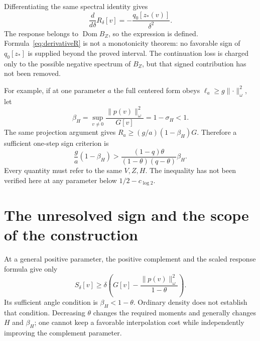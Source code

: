 \documentclass[11pt,a4paper]{article}
\numberwithin{equation}{section}
\theoremstyle{remark}
\newcommand{\dom}{\operatorname{Dom}}
\newcommand{\norm}[1]{\lVert #1\rVert}
\begin{document}
Differentiating the same spectral identity gives
\begin{equation}\label{eq:derivativeR}
 \frac{d}{d\delta}R_\delta[v]
 =-\frac{q_0[z_*(v)]}{\delta^2}.
\end{equation}
The response belongs to $\dom B_Z$, so the expression is defined. Formula~\eqref{eq:derivativeR} is not a monotonicity theorem: no favorable sign of $q_0[z_*]$ is supplied beyond the proved interval. The continuation loss is charged only to the possible negative spectrum of $B_Z$, but that signed contribution has not been removed.

For example, if at one parameter $a$ the full centered form obeys
$\ell_a\ge g\norm{\cdot}_\omega^2$, let
\begin{equation}\label{eq:beta}
 \beta_H=\sup_{v\ne0}\frac{\norm{p(v)}_\omega^2}{G[v]}=1-\sigma_H<1.
\end{equation}
The same projection argument gives
$R_a\ge(g/a)(1-\beta_H)G$. Therefore a sufficient one-step sign criterion is
\begin{equation}\label{eq:onestep}
 \frac ga(1-\beta_H)
 >\frac{(1-q)\theta}{(1-\theta)(q-\theta)}\beta_H.
\end{equation}
Every quantity must refer to the same $V,Z,H$. The inequality has not been verified here at any parameter below $1/2-c_{\log2}$.

\section{The unresolved sign and the scope of the construction}\label{sec:scope}

At a general positive parameter, the positive complement and the scaled response formula give only
\begin{equation}\label{eq:anglebound}
 S_\delta[v]\ge\delta\left(G[v]
                 -\frac{\norm{p(v)}_\omega^2}{1-\theta}\right).
\end{equation}
Its sufficient angle condition is $\beta_H<1-\theta$. Ordinary density does not establish that condition. Decreasing $\theta$ changes the required moments and generally changes $H$ and $\beta_H$; one cannot keep a favorable interpolation cost while independently improving the complement parameter.
\end{document}
